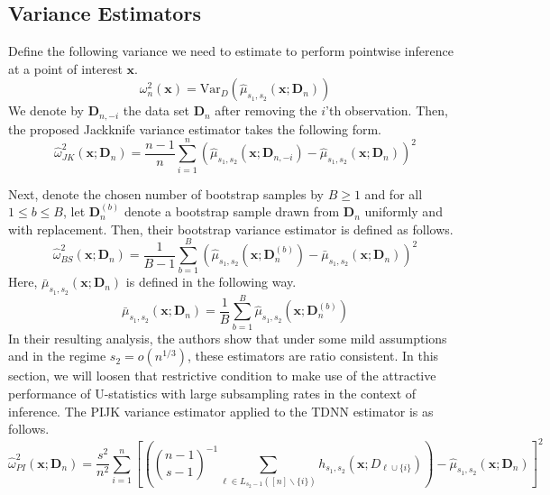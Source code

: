 \documentclass[letterpaper,10pt]{article}
\numberwithin{equation}{section}
\numberwithin{thm}{section}
\numberwithin{lem}{section}
\numberwithin{cor}{section}
\renewcommand{\hat}{\widehat}
\newcommand{\1}{\mathbbm{1}}
\newcommand{\Var}{\text{Var}}
\begin{document}
\subsection{Variance Estimators}\label{Var_Ests}

Define the following variance we need to estimate to perform pointwise inference at a point of interest $\mathbf{x}$.
\begin{equation}
	\omega^{2}_{n}\left(\mathbf{x}\right)
	= \Var_{D}\left(\hat{\mu}_{s_1, s_2}\left(\mathbf{x}; \mathbf{D}_n\right)\right)
\end{equation}
We denote by $\mathbf{D}_{n, -i}$ the data set $\mathbf{D}_n$ after removing the $i$'th observation.
Then, the proposed Jackknife variance estimator takes the following form.
\begin{equation}
	\hat{\omega}_{JK}^2\left(\mathbf{x}; \mathbf{D}_n\right)
	= \frac{n-1}{n} \sum_{i = 1}^{n}\left(\hat{\mu}_{s_1, s_2}\left(\mathbf{x}; \mathbf{D}_{n, -i}\right) - \hat{\mu}_{s_1, s_2}\left(\mathbf{x}; \mathbf{D}_{n}\right)\right)^2
\end{equation}

Next, denote the chosen number of bootstrap samples by $B \geq 1$ and for all $1 \leq b \leq B$, let $\mathbf{D}^{(b)}_n$ denote a bootstrap sample drawn from $\mathbf{D}_n$ uniformly and with replacement.
Then, their bootstrap variance estimator is defined as follows.
\begin{equation}
	\hat{\omega}_{BS}^2\left(\mathbf{x}; \mathbf{D}_n\right)
	= \frac{1}{B - 1}\sum_{b = 1}^{B} \left(\hat{\mu}_{s_1, s_2}\left(\mathbf{x}; \mathbf{D}_{n}^{(b)}\right) - \bar{\mu}_{s_1, s_2}\left(\mathbf{x}; \mathbf{D}_{n}\right)\right)^2
\end{equation}
Here, $\bar{\mu}_{s_1, s_2}\left(\mathbf{x}; \mathbf{D}_{n}\right)$ is defined in the following way.
\begin{equation}
	\bar{\mu}_{s_1, s_2}\left(\mathbf{x}; \mathbf{D}_{n}\right)
	= \frac{1}{B} \sum_{b = 1}^{B} \hat{\mu}_{s_1, s_2}\left(\mathbf{x}; \mathbf{D}_{n}^{(b)}\right)
\end{equation}
In their resulting analysis, the authors show that under some mild assumptions and in the regime $s_2 = o(n^{1/3})$, these estimators are ratio consistent.
In this section, we will loosen that restrictive condition to make use of the attractive performance of U-statistics with large subsampling rates in the context of inference.
The PIJK variance estimator applied to the TDNN estimator is as follows.
\begin{equation}
	\hat{\omega}_{PI}^2\left(\mathbf{x}; \mathbf{D}_n\right)
	= \frac{s^2}{n^2}\sum_{i = 1}^{n}\left[\left(
		\binom{n-1}{s-1}^{-1} \sum_{\ell \in L_{s_2-1}([n]\backslash\{i\})} h_{s_1, s_2}\left(\mathbf{x}; D_{\ell \cup \{i\}}\right)\right)
		- \hat{\mu}_{s_1, s_2}\left(\mathbf{x}; \mathbf{D}_n\right)\right]^2
\end{equation}
\end{document}
